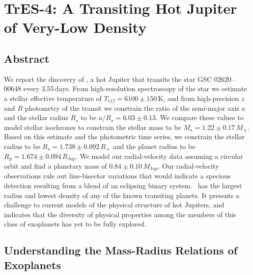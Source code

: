 \chapter[TrES-4: A Transiting Hot Jupiter of Very-Low Density]%
{%
TrES-4: A Transiting Hot Jupiter of Very-Low Density%
\protect\CFNG%
}\label{cha:tres4}

\section*{Abstract}\label{cha:tres4:sec:abs}

We report the discovery of \tresFour, a hot Jupiter that transits the star GSC 02620--00648 every 3.55\,days. From high-resolution spectroscopy of the star
we estimate a stellar effective temperature of \mbox{$T_{\mathrm eff} = 6100 \pm 150$\,K},
and from high-precision $z$ and $B$ photometry of the transit we constrain the
ratio of the semi-major axis $a$ and the stellar radius $R_{\star}$ to be
\mbox{$a/R_{\star} = 6.03 \pm 0.13$}. We compare these values to model stellar
isochrones to constrain the stellar mass to be
\mbox{$M_{\star} = 1.22 \pm 0.17$\,$M_{\sun}$}. Based on this estimate and the photometric time series, we constrain the stellar radius to be
\mbox{$R_{\star} = 1.738 \pm 0.092$\,$R_{\sun}$} and the planet radius to be
\mbox{$R_{\mathrm p} = 1.674 \pm 0.094$\,$R_{\mathrm Jup}$}. We model our radial-velocity data assuming a circular orbit and find a planetary mass of
$0.84 \pm 0.10$\,$M_{\mathrm Jup}$. Our radial-velocity observations rule out
line-bisector variations that would indicate a specious detection resulting
from a blend of an eclipsing binary system. \tresFour\ has the largest radius and
lowest density of any of the known transiting planets. It presents a challenge
to current models of the physical structure of hot Jupiters, and indicates that
the diversity of physical properties among the members of this class of
exoplanets has yet to be fully explored.

\section{Understanding the Mass-Radius Relations of Exoplanets}\label{cha:tres4:sec:intro}


